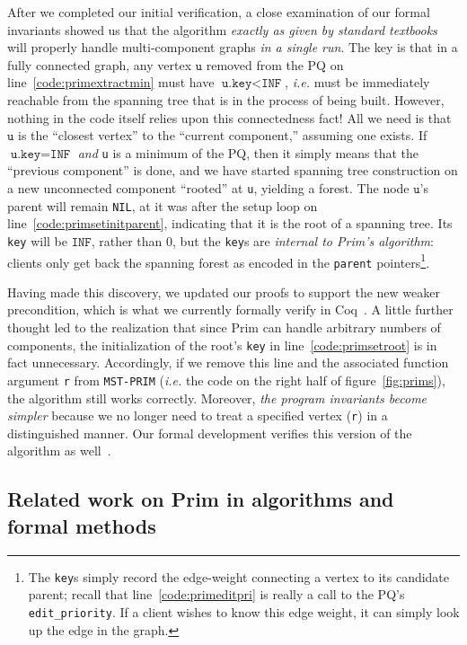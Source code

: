 After we completed our initial verification, a close examination of our formal invariants showed us that the algorithm \emph{exactly as given by standard textbooks} will properly handle multi-component graphs \textit{in a single run}.  The key is that in a fully connected graph, any vertex $\texttt{u}$ removed from the PQ on line~\ref{code:primextractmin} must have $\texttt{u.key} < \texttt{INF}$, \emph{i.e.} must be immediately reachable from the spanning tree that is in the process of being built.  However, nothing in the code itself relies upon this connectedness fact!  All we need is that $\texttt{u}$ is the ``closest vertex'' to the ``current component,'' assuming one exists.  If $\texttt{u.key}=\texttt{INF}$ \emph{and} \texttt{u} is a minimum of the PQ, then it simply means that the ``previous component'' is done, and we have started spanning tree construction on a new unconnected component ``rooted'' at \texttt{u}, yielding a forest.  The node $\texttt{u}$'s parent will remain \texttt{NIL}, at it was after the setup loop on line~\ref{code:primsetinitparent}, indicating that it is the root of a spanning tree.  Its \texttt{key} will be $\texttt{INF}$, rather than $0$, but the \texttt{key}s are \emph{internal to Prim's algorithm}: clients only get back the spanning forest as encoded in the \texttt{parent} pointers\footnote{The \texttt{key}s simply record the edge-weight connecting a vertex to its candidate parent; recall that line~\ref{code:primeditpri} is really a call to the PQ's \texttt{edit\_priority}.  If a client wishes to know this edge weight, it can simply look up the edge in the graph.}.

Having made this discovery, we updated our proofs to support the new weaker precondition, which is what we currently formally verify in Coq~\cite{CITE}.
A little further thought led to the realization that since Prim can handle arbitrary numbers of components, the initialization of the root's \texttt{key} in line~\ref{code:primsetroot} is in fact unnecessary.  Accordingly, if we remove this line and the associated function argument \texttt{r} from \texttt{MST-PRIM} (\emph{i.e.} the code on the right half of figure~\ref{fig:prims}), the algorithm still works correctly.  Moreover, \emph{the program invariants become simpler} because we no longer need to treat a specified vertex (\texttt{r}) in a distinguished manner.  Our formal development verifies this version of the algorithm as well~\cite{CITE}.

\subsection{Related work on Prim in algorithms and formal methods}
\label{sec:relworkprim}

